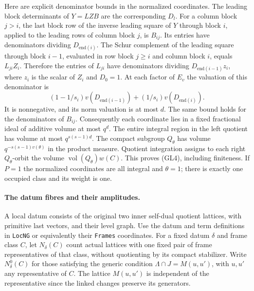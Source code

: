 Here are explicit denominator bounds in the normalized
coordinates. The leading block determinants of \(Y=LZB\)
are the corresponding \(D_l\). For a column block \(j>i\),
the last block row of the inverse leading square of \(Y\)
through block \(i\), applied to the leading rows of column
block \(j\), is \(B_{ij}\). Its entries have denominators
dividing \(D_{\mathrm{end}(i)}\). The Schur complement of the
leading square through block \(i-1\), evaluated in row
block \(j\ge i\) and column block \(i\), equals
\(L_{ji} Z_i\). Therefore the entries of \(L_{ji}\) have
denominators dividing \(D_{\mathrm{end}(i-1)}z_i\), where
\(z_i\) is the scalar of \(Z_i\) and \(D_0=1\).
At each factor of \(E_v\) the valuation of this denominator is
\[
 (1-1/s_i)v(D_{\mathrm{end}(i-1)})
             +(1/s_i)v(D_{\mathrm{end}(i)}).
\]
It is nonnegative, and its norm valuation is at most \(d\).
The same bound holds for the denominators of \(B_{ij}\).
Consequently each coordinate lies in a fixed fractional ideal
of additive volume at most \(q^d\). The entire integral region
in the left quotient has volume at most \(q^{s(s-1)d}\).
The compact subgroup \(Q_\theta\) has volume
\(q^{-s(s-1)v(\theta)}\) in the product measure.
Quotient integration assigns to each right \(Q_\theta\)-orbit
the volume \(\operatorname{vol}(Q_\theta)w(C)\).
This proves (GL4), including finiteness. If \(P=1\) the
normalized coordinates are all integral and \(\theta=1\);
there is exactly one occupied class and its weight is one.

\paragraph{The datum fibres and their amplitudes.}
A local datum consists of the original two inner self-dual
quotient lattices, with primitive last vectors, and their
level graph. Use the datum and term definitions in
\texttt{LocNG} or equivalently their \texttt{Frames} coordinates.
For a fixed datum \(\delta\) and frame class \(C\), let
\(N_\delta(C)\) count actual lattices with one fixed pair of
frame representatives of that class, without quotienting by its compact
stabilizer. Write \(N_\delta^0(C)\)
for those satisfying the generic condition
\(\Lambda\cap J=M(u,u')\), with \(u,u'\) any representative
of \(C\). The lattice \(M(u,u')\) is independent of the
representative since the linked changes preserve its generators.

